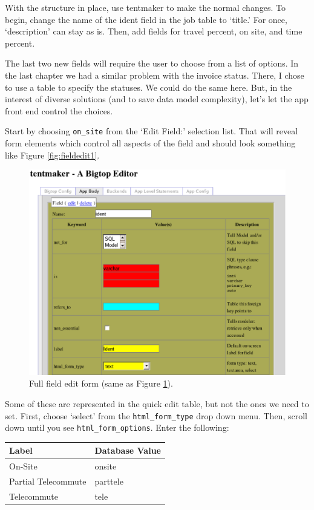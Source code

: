 With the structure in place, use tentmaker to make the normal changes.
To begin, change the name of the ident field in the job table to `title.'
For once, `description' can stay as is.  Then, add fields for
travel percent, on site, and time percent.

The last two new fields will require the user to choose from a list of
options.  In the last chapter we had a similar problem with the invoice
status.  There, I chose to use a table to specify the statuses.  We
could do the same here.  But, in the interest of diverse solutions (and to
save data model complexity), let's let the app front end control the choices.

Start by choosing \verb+on_site+ from the `Edit Field:' selection
list.  That will reveal form elements which control all aspects of the
field and should look something like Figure \ref{fig:fieldedit1}.

\begin{figure}
\includegraphics[width=6in]{fieldedit}
\caption{Full field edit form (same as Figure \ref{fig:fieldedit}).}
\label{fig:fieldedit}
\end{figure}

Some of these are represented in the quick edit table, but not
the ones we need to set.  First, choose `select' from the
\verb+html_form_type+ drop down menu.  Then, scroll down until you see
\verb+html_form_options+.  Enter the following:

\begin{tabular}{l|l}
Label               & Database Value    \\
\hline
On-Site             & onsite            \\
Partial Telecommute & parttele          \\
Telecommute         & tele              \\
\end{tabular}

